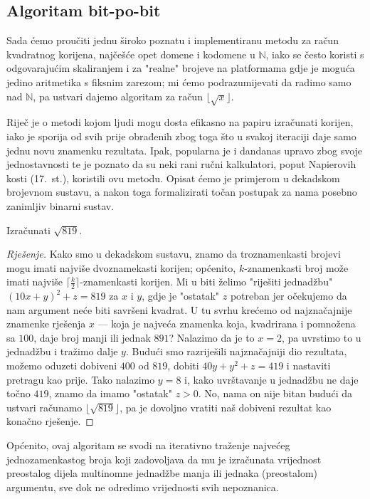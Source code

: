 \documentclass[12pt]{scrartcl}
\newcommand{\primjer}[2]{%
    \renewcommand\qedsymbol{$\vartriangleleft$}%
    \begin{example}%
        #1%
    \end{example}%
    \begin{proof}[Rješenje]%
        #2%
    \end{proof}%
    \renewcommand\qedsymbol{$\Square$}
}
\begin{document}
\subsection{Algoritam bit-po-bit}
Sada ćemo proučiti jednu široko poznatu i implementiranu metodu za račun kvadratnog korijena, najčešće opet domene i kodomene u
$\mathbb{N}$, iako se često koristi s odgovarajućim skaliranjem i za "realne" brojeve
 na platformama gdje je moguća jedino aritmetika s fiksnim zarezom; mi ćemo podrazumijevati da radimo samo nad $\mathbb N$, pa ustvari
 dajemo algoritam za račun $\lfloor\sqrt x\rfloor$.

Riječ je o metodi kojom ljudi mogu dosta efikasno na papiru izračunati korijen, iako je sporija od svih prije obrađenih zbog toga
što u svakoj iteraciji daje samo jednu novu znamenku rezultata. Ipak, popularna je i dandanas upravo zbog svoje jednostavnosti te je
poznato da su neki rani ručni kalkulatori, poput Napierovih kosti (17.\ st.), koristili ovu metodu.
 Opisat ćemo je primjerom
u dekadskom brojevnom sustavu, a nakon toga formalizirati točan postupak za nama posebno zanimljiv binarni sustav.

\primjer{Izračunati $\sqrt{819}$.}
{Kako smo u dekadskom sustavu, znamo da troznamenkasti brojevi mogu imati najviše dvoznamekasti korijen; općenito, $k$-znamenkasti broj
može imati najviše $\lceil\frac{k}{2}\rceil$-znamenkasti korijen. Mi u biti želimo "riješiti jednadžbu" $(10x+y)^2+z=819$ za $x$ i $y$, gdje je 
"ostatak" $z$ potreban jer očekujemo da nam argument neće biti savršeni kvadrat. U tu svrhu krećemo od najznačajnije znamenke rješenja
$x$ --- koja je najveća znamenka koja, kvadrirana i pomnožena sa $100$, daje broj manji ili jednak $891$? Nalazimo da je to $x=2$, pa
uvrstimo to u jednadžbu i tražimo dalje $y$. Budući smo razriješili najznačajniji dio rezultata, možemo oduzeti dobiveni $400$ od $819$,
dobiti $40y+y^2+z=419$
i nastaviti pretragu kao prije. Tako nalazimo $y=8$ i, kako uvrštavanje u jednadžbu ne daje točno $419$,
znamo da imamo "ostatak" $z>0$. No, nama on nije bitan budući da ustvari računamo $\lfloor\sqrt{819}\rfloor$, pa je
 dovoljno vratiti naš dobiveni rezultat kao konačno rješenje.}

Općenito, ovaj algoritam se svodi na iterativno traženje najvećeg jednozamenkastog
broja koji zadovoljava da mu je izračunata vrijednost preostalog dijela multinomne jednadžbe manja ili jednaka (preostalom) argumentu, sve
dok ne odredimo vrijednosti svih nepoznanica.
\end{document}
